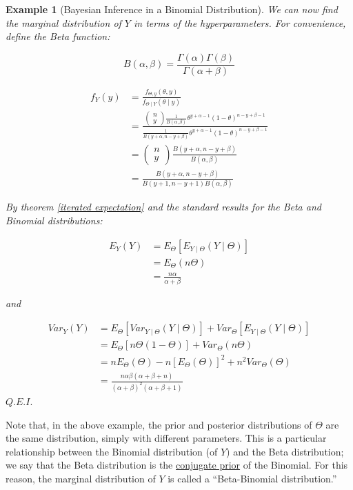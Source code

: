 \documentclass[12pt,a4paper]{article}
\newtheorem{ex}[thm]{Example}
\begin{document}
\begin{ex}[Bayesian Inference in a Binomial Distribution]
We can now find the marginal distribution of $Y$ in terms of the hyperparameters. For convenience, define the Beta function:

$$B(\alpha,\beta) = \frac{\Gamma(\alpha)\Gamma(\beta)}{\Gamma(\alpha + \beta)}$$

\begin{align*}
f_Y(y) &= \frac{f_{\Theta,y}(\theta,y)}{f_{\Theta\mid Y}(\theta \mid y)}\\
&= \frac{\left(\!\!\begin{array}{c} n\\y \end{array}\!\!\right) \frac{1}{B(\alpha,\beta)} \theta^{y+\alpha-1} (1-\theta)^{n-y+\beta-1}}{\frac{1}{B(y+\alpha,n-y+\beta)} \theta^{y+\alpha-1} (1-\theta)^{n-y+\beta -1}}\\
&= \left(\!\!\begin{array}{c} n\\y \end{array}\!\!\right) \frac{B(y+\alpha,n-y+\beta)}{B(\alpha,\beta)}\\
&= \frac{B(y+\alpha,n-y+\beta)}{B(y+1,n-y+1)B(\alpha,\beta)}
\end{align*}

By theorem \ref{iterated expectation} and the standard results for the Beta and Binomial distributions:

\begin{align*}
E_Y(Y) &= E_\Theta[E_{Y\mid \Theta}(Y\mid\Theta)]\\
&= E_\Theta(n\Theta)\\
&= \frac{n\alpha}{\alpha+\beta}
\end{align*}
\begin{center} and \end{center}
\begin{align*}
Var_Y(Y) &= E_\Theta[Var_{Y\mid\Theta}(Y\mid\Theta)] + Var_\Theta[E_{Y\mid\Theta}(Y\mid\Theta)]\\
&= E_\Theta[n\Theta(1-\Theta)] + Var_\Theta(n\Theta)\\
&= nE_\Theta(\Theta) - n[E_\Theta(\Theta)]^2 + n^2 Var_\Theta(\Theta)\\
&=  \frac{n\alpha\beta(\alpha+\beta+n)}{(\alpha+\beta)^2(\alpha+\beta+1)}
\end{align*}\hfill$Q.E.I.$

\end{ex}

Note that, in the above example, the prior and posterior distributions of $\Theta$ are the same distribution, simply with different parameters. This is a particular relationship between the Binomial distribution (of $Y$) and the Beta distribution; we say that the Beta distribution is the \underline{conjugate prior} of the Binomial. For this reason, the marginal distribution of $Y$ is called a ``Beta-Binomial distribution.''
\end{document}
